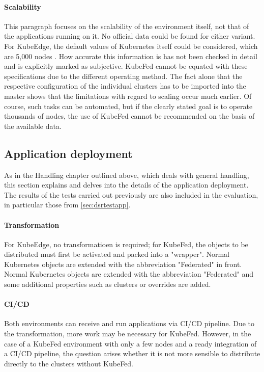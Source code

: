 \documentclass[MSC,Master,english]{twbook}%
\begin{document}
\paragraph{Scalability} This paragraph focuses on the scalability of the environment itself, not that of the applications running on it. No official data could be found for either variant. For KubeEdge, the default values of Kubernetes itself could be considered, which are 5,000 nodes \cite{k8s-doc-bigcluster}. How accurate this information is has not been checked in detail and is explicitly marked as subjective. KubeFed cannot be equated with these specifications due to the different operating method. The fact alone that the respective configuration of the individual clusters has to be imported into the master shows that the limitations with regard to scaling occur much earlier. Of course, such tasks can be automated, but if the clearly stated goal is to operate thousands of nodes, the use of KubeFed cannot be recommended on the basis of the available data. 

\subsection{Application deployment}
As in the Handling chapter outlined above, which deals with general handling, this section explains and delves into the details of the application deployment. The results of the tests carried out previously are also included in the evaluation, in particular those from \autoref{sec:dsrtestapp}.

\paragraph{Transformation} For KubeEdge, no transformatioen is required; for KubeFed, the objects to be distributed must first be activated and packed into a "wrapper". Normal Kubernetes objects are extended with the abbreviation "Federated" in front. Normal Kubernetes objects are extended with the abbreviation "Federated" and some additional properties such as clusters or overrides are added.

\paragraph{CI/CD} Both environments can receive and run applications via \ac{CI/CD} pipeline. Due to the transformation, more work may be necessary for KubeFed. However, in the case of a KubeFed environment with only a few nodes and a ready integration of a CI/CD pipeline, the question arises whether it is not more sensible to distribute directly to the clusters without KubeFed.
\end{document}
